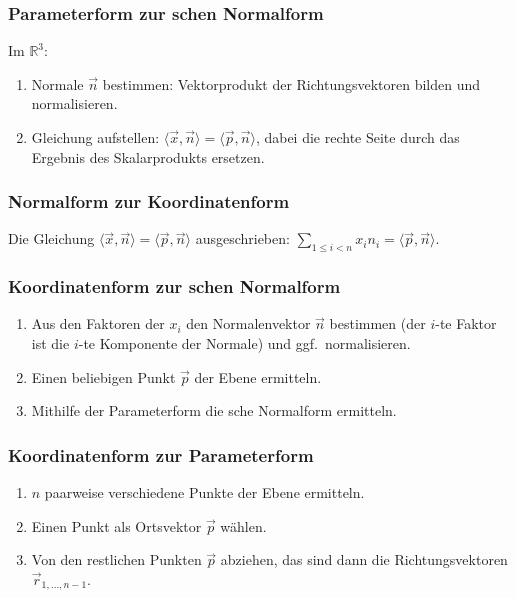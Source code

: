 \subsubsection*{Parameterform zur \protect{}schen Normalform}

Im $\mathbb{R}^{3}$:
\begin{enumerate}
  \item Normale $\vec{n}$ bestimmen: Vektorprodukt der Richtungsvektoren bilden und normalisieren.
  \item Gleichung aufstellen: $\langle \vec{x},\vec{n}\rangle =\langle \vec{p},\vec{n}\rangle $, dabei die rechte Seite durch das Ergebnis des Skalarprodukts ersetzen.
\end{enumerate}

\subsubsection*{Normalform zur Koordinatenform}

Die Gleichung $\langle \vec{x},\vec{n}\rangle =\langle \vec{p},\vec{n}\rangle $ ausgeschrieben:
$\sum_{1 \leq i < n} x_i n_i = \langle \vec p, \vec n \rangle $.

\subsubsection*{Koordinatenform zur schen Normalform}
\begin{enumerate}
  \item Aus den Faktoren der $x_i$ den Normalenvektor $\vec{n}$ bestimmen (der $i$-te Faktor ist die $i$-te Komponente der Normale) und ggf.~normalisieren.
  \item Einen beliebigen Punkt $\vec{p}$ der Ebene ermitteln.
  \item Mithilfe der Parameterform die sche Normalform ermitteln.
\end{enumerate}

\subsubsection*{Koordinatenform zur Parameterform}
\begin{enumerate}
  \item $n$ paarweise verschiedene Punkte der Ebene ermitteln.
  \item Einen Punkt als Ortsvektor $\vec{p}$ wählen.
  \item Von den restlichen Punkten $\vec{p}$ abziehen, das sind dann die Richtungsvektoren $\vec{r}_{1,\ldots,n-1}$.
\end{enumerate}

